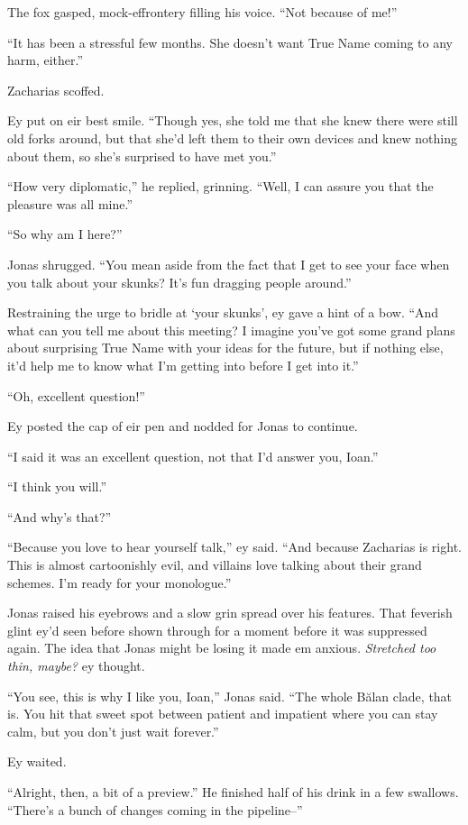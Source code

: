The fox gasped, mock-effrontery filling his voice. ``Not because of me!''

``It has been a stressful few months. She doesn't want True Name coming to any harm, either.''

Zacharias scoffed.

Ey put on eir best smile. ``Though yes, she told me that she knew there were still old forks around, but that she'd left them to their own devices and knew nothing about them, so she's surprised to have met you.''

``How very diplomatic,'' he replied, grinning. ``Well, I can assure you that the pleasure was all mine.''

``So why am I here?''

Jonas shrugged. ``You mean aside from the fact that I get to see your face when you talk about your skunks? It's fun dragging people around.''

Restraining the urge to bridle at `your skunks', ey gave a hint of a bow. ``And what can you tell me about this meeting? I imagine you've got some grand plans about surprising True Name with your ideas for the future, but if nothing else, it'd help me to know what I'm getting into before I get into it.''

``Oh, excellent question!''

Ey posted the cap of eir pen and nodded for Jonas to continue.

``I said it was an excellent question, not that I'd answer you, Ioan.''

``I think you will.''

``And why's that?''

``Because you love to hear yourself talk,'' ey said. ``And because Zacharias is right. This is almost cartoonishly evil, and villains love talking about their grand schemes. I'm ready for your monologue.''

Jonas raised his eyebrows and a slow grin spread over his features. That feverish glint ey'd seen before shown through for a moment before it was suppressed again. The idea that Jonas might be losing it made em anxious. \emph{Stretched too thin, maybe?} ey thought.

``You see, this is why I like you, Ioan,'' Jonas said. ``The whole Bălan clade, that is. You hit that sweet spot between patient and impatient where you can stay calm, but you don't just wait forever.''

Ey waited.

``Alright, then, a bit of a preview.'' He finished half of his drink in a few swallows. ``There's a bunch of changes coming in the pipeline--''

